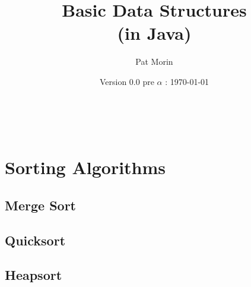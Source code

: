\documentclass[11pt]{book}
\title{Basic Data Structures\\(in Java)}
\author{Pat Morin}
\date{Version 0.0 pre $\alpha$ : \today}
\begin{document}
\begin{titlepage}
  \maketitle
\end{titlepage}

\ \newpage



\tableofcontents













\chapter{Sorting Algorithms}
\section{Merge Sort}
\section{Quicksort}
\section{Heapsort}
\end{document}
